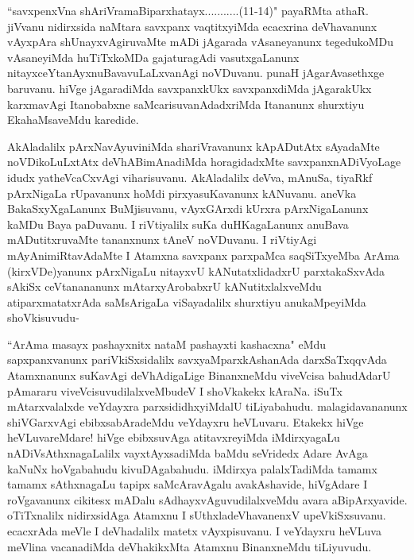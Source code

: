 
\begin{artha}
``savxpenxVna shAriVramaBiparxhatayx...........(11-14)" payaRMta athaR. jiVvanu nidirxsida naMtara savxpanx vaqtitxyiMda ecacxrina deVhavanunx vAyxpAra shUnayxvAgiruvaMte mADi jAgarada vAsaneyanunx tegedukoMDu vAsaneyiMda huTiTxkoMDa gajaturagAdi vasutxgaLanunx nitayxceYtanAyxnuBavavuLaLxvanAgi noVDuvanu. punaH jAgarAvasethxge baruvanu. hiVge jAgaradiMda savxpanxkUkx savxpanxdiMda jAgarakUkx karxmavAgi Itanobabxne saMcarisuvanAdadxriMda Itananunx shurxtiyu EkahaMsaveMdu karedide. 
\end{artha}

\begin{artha}
AkAladalilx pArxNavAyuviniMda shariVravanunx kApADutAtx sAyadaMte noVDikoLuLxtAtx deVhABimAnadiMda horagidadxMte savxpanxnADiVyoLage idudx yatheVcaCxvAgi viharisuvanu. AkAladalilx deVva, mAnuSa, tiyaRkf pArxNigaLa rUpavanunx hoMdi pirxyasuKavanunx kANuvanu. aneVka BakaSxyXgaLanunx BuMjisuvanu, vAyxGArxdi kUrxra pArxNigaLanunx kaMDu Baya paDuvanu. I riVtiyalilx suKa duHKagaLanunx anuBava mADutitxruvaMte tananxnunx tAneV noVDuvanu. I riVtiyAgi mAyAnimiRtavAdaMte I Atamxna savxpanx parxpaMca saqSiTxyeMba ArAma (kirxVDe)yanunx pArxNigaLu nitayxvU kANutatxlidadxrU parxtakaSxvAda sAkiSx ceVtanananunx mAtarxyArobabxrU kANutitxlalxveMdu atiparxmatatxrAda saMsArigaLa viSayadalilx shurxtiyu anukaMpeyiMda shoVkisuvudu-
\end{artha}

\begin{artha}%
``ArAma masayx pashayxnitx nataM pashayxti kashacxna" eMdu sapxpanxvanunx pariVkiSxsidalilx savxyaMparxkAshanAda darxSaTxqqvAda Atamxnanunx suKavAgi deVhAdigaLige BinanxneMdu viveVcisa bahudAdarU pAmararu viveVcisuvudilalxveMbudeV I shoVkakekx kAraNa. iSuTx mAtarxvalalxde veYdayxra parxsididhxyiMdalU tiLiyabahudu. malagidavananunx shiVGarxvAgi ebibxsabAradeMdu veYdayxru heVLuvaru. Etakekx hiVge heVLuvareMdare! hiVge ebibxsuvAga atitavxreyiMda iMdirxyagaLu nADiVsAthxnagaLalilx vayxtAyxsadiMda baMdu seVridedx Adare AvAga kaNuNx hoVgabahudu kivuDAgabahudu. iMdirxya palalxTadiMda tamamx tamamx sAthxnagaLu tapipx saMcAravAgalu avakAshavide, hiVgAdare I roVgavanunx cikitesx mADalu sAdhayxvAguvudilalxveMdu avara aBipArxyavide. oTiTxnalilx nidirxsidAga Atamxnu I sUthxladeVhavanenxV upeVkiSxsuvanu. ecacxrAda meVle I deVhadalilx matetx vAyxpisuvanu. I veYdayxru heVLuva meVlina vacanadiMda deVhakikxMta Atamxnu BinanxneMdu tiLiyuvudu.  
\end{artha}

